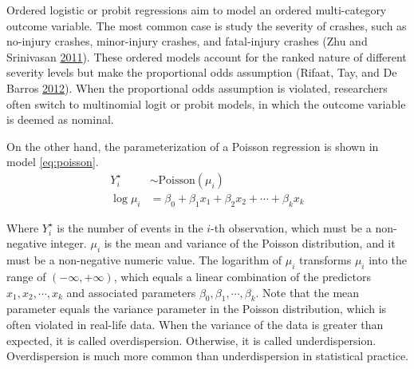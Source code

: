 \documentclass[12pt]{book}
\numberwithin{equation}{chapter}
\begin{document}
Ordered logistic or probit regressions aim to model an ordered multi-category outcome variable. The most common case is study the severity of crashes, such as no-injury crashes, minor-injury crashes, and fatal-injury crashes (Zhu and Srinivasan \protect\hyperlink{ref-zhu2011comprehensive}{2011}). These ordered models account for the ranked nature of different severity levels but make the proportional odds assumption (Rifaat, Tay, and De Barros \protect\hyperlink{ref-rifaat2012severity}{2012}). When the proportional odds assumption is violated, researchers often switch to multinomial logit or probit models, in which the outcome variable is deemed as nominal.

On the other hand, the parameterization of a Poisson regression is shown in model \eqref{eq:poisson}.
\begin{equation}
\begin{split}
Y_i^\star & \sim \text{Poisson}(\mu_i) \\
\log\mu_i & = \beta_0 + \beta_1x_1 + \beta_2x_2 + \cdots + \beta_kx_k
\label{eq:poisson}
\end{split}
\end{equation}

Where \(Y_i^\star\) is the number of events in the \(i\)-th observation, which must be a non-negative integer. \(\mu_i\) is the mean and variance of the Poisson distribution, and it must be a non-negative numeric value. The logarithm of \(\mu_i\) transforms \(\mu_i\) into the range of \((-\infty, +\infty)\), which equals a linear combination of the predictors \(x_1, x_2, \cdots, x_k\) and associated parameters \(\beta_0, \beta_1, \cdots, \beta_k\). Note that the mean parameter equals the variance parameter in the Poisson distribution, which is often violated in real-life data. When the variance of the data is greater than expected, it is called overdispersion. Otherwise, it is called underdispersion. Overdispersion is much more common than underdispersion in statistical practice.
\end{document}
